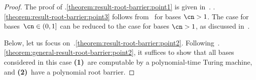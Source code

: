 \begin{proof}
  The proof of
  .\ref{theorem:result-root-barrier:point1} is
  given in~.
  .\ref{theorem:result-root-barrier:point3}
  follows from~ for bases $\cn > 1$. The case
  for bases~$\cn \in (0,1]$ can be reduced to the case for bases $\cn > 1$, as
  discussed in~. 

  Below, let us focus on~.\ref{theorem:result-root-barrier:point2}. Following~.\ref{theorem:general-result-root-barrier:point2}, 
  it suffices to show that all bases considered in this case \textbf{(1)}~are computable by a polynomial-time Turing machine, and \textbf{(2)}~have a polynomial root barrier. 


\end{proof}
